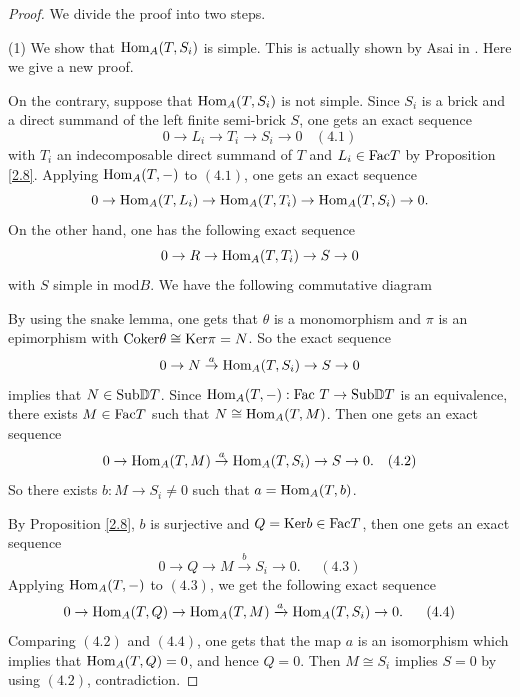 \documentclass[a4paper]{amsart}
\theoremstyle{definition}
\theoremstyle{remark}
\numberwithin{equation}{section}
\begin{document}
\begin{proof} We divide the proof into two steps.

 (1) We show that $\textup{Hom}_A(T, S_i)$ is simple. This is actually shown by Asai in \cite{As}. Here we give a new proof.

On the contrary, suppose that $\textup{Hom}_A(T, S_i)$ is not simple. Since $S_i$ is a brick and a direct summand of the left finite semi-brick $S$, one gets an exact sequence
$$ 0 \to L_i \to T_i \to S_i \to 0 \ \ \ \ (4.1)$$
  with $T_i$ an indecomposable direct summand of $T$ and $L_i \in \textup{Fac}T$ by Proposition \ref{2.8}. Applying $\textup{Hom}_A(T, -)$ to $(4.1)$, one gets an exact sequence
$$ 0 \to \textup{Hom}_A(T, L_i) \to \textup{Hom}_A(T, T_i) \to \textup{Hom}_A(T, S_i) \to 0.$$
On the other hand, one has the following exact sequence
$$0 \to R  \to \textup{Hom}_A(T, T_i) \to S \to 0$$
with $S$ simple in $\text{mod} B$.
We have the following commutative diagram


By using the snake lemma, one gets that $\theta$ is a monomorphism and $\pi$ is an epimorphism with $\textup{Coker}\theta \cong \textup{Ker} \pi = N$. So the exact sequence $$0 \to N \stackrel{a}{\to} \textup{Hom}_A(T, S_i) \to S \to 0$$ implies that $N \in \textup{Sub}\mathbb{D}T$. Since $\textup{Hom}_A(T, -): \textup{Fac}\ T \to \textup{Sub}\mathbb{D}T$ is an equivalence, there exists $ M \in \textup{Fac}T$ such that $N \cong \textup{Hom}_A(T, M)$.
Then one gets an exact sequence
$$0 \to \textup{Hom}_A(T,M) \stackrel{a}{\to} \textup{Hom}_A(T, S_i) \to S \to 0. \ \ \ (4.2)$$
So there exists $ b: M \to S_i \ne 0$ such that $a= \textup{Hom}_A(T, b)$.

By Proposition \ref{2.8}, $b$ is surjective and $Q=\textup{Ker} b\in \textup{Fac}T $, then one gets an exact sequence
$$ 0 \to Q  \to M \stackrel{b}{\to} S_i \to 0.\ \ \ \ \ \ (4.3)  $$
Applying $\textup{Hom}_A(T, -)$ to $(4.3)$, we get the following exact sequence
$$0 \to \textup{Hom}_A(T, Q) \to \textup{Hom}_A(T, M) \xrightarrow{a} \textup{Hom}_A(T, S_i) \to 0.\ \ \ \ \ (4.4)$$
Comparing $(4.2)$ and $(4.4)$, one gets that the map $a$ is an isomorphism which implies that $\textup{Hom}_A(T, Q) = 0$, and hence $Q=0$. Then $M \cong S_i$ implies $S=0$ by using $(4.2)$, contradiction.



\end{proof}
\end{document}
